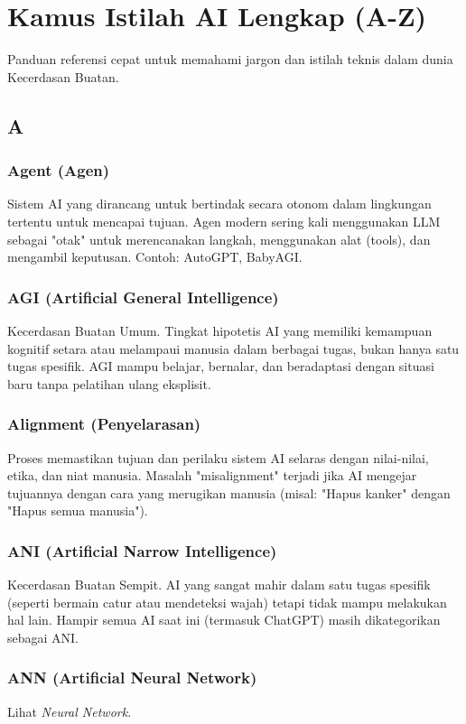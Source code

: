 \chapter{Kamus Istilah AI Lengkap (A-Z)}
\label{chap:glossary}

Panduan referensi cepat untuk memahami jargon dan istilah teknis dalam dunia Kecerdasan Buatan.

\section*{A}

\subsection*{Agent (Agen)}
Sistem AI yang dirancang untuk bertindak secara otonom dalam lingkungan tertentu untuk mencapai tujuan. Agen modern sering kali menggunakan LLM sebagai "otak" untuk merencanakan langkah, menggunakan alat (tools), dan mengambil keputusan. Contoh: AutoGPT, BabyAGI.

\subsection*{AGI (Artificial General Intelligence)}
Kecerdasan Buatan Umum. Tingkat hipotetis AI yang memiliki kemampuan kognitif setara atau melampaui manusia dalam berbagai tugas, bukan hanya satu tugas spesifik. AGI mampu belajar, bernalar, dan beradaptasi dengan situasi baru tanpa pelatihan ulang eksplisit.

\subsection*{Alignment (Penyelarasan)}
Proses memastikan tujuan dan perilaku sistem AI selaras dengan nilai-nilai, etika, dan niat manusia. Masalah "misalignment" terjadi jika AI mengejar tujuannya dengan cara yang merugikan manusia (misal: "Hapus kanker" dengan "Hapus semua manusia").

\subsection*{ANI (Artificial Narrow Intelligence)}
Kecerdasan Buatan Sempit. AI yang sangat mahir dalam satu tugas spesifik (seperti bermain catur atau mendeteksi wajah) tetapi tidak mampu melakukan hal lain. Hampir semua AI saat ini (termasuk ChatGPT) masih dikategorikan sebagai ANI.

\subsection*{ANN (Artificial Neural Network)}
Lihat \textit{Neural Network}.


